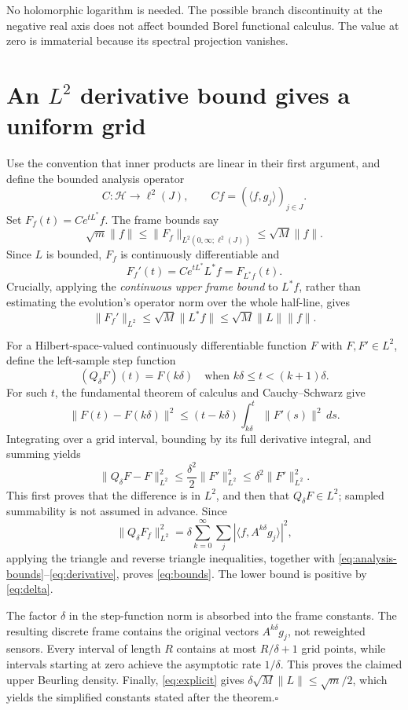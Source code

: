 \documentclass[11pt]{article}
\newcommand{\HH}{\mathcal H}
\begin{document}
No holomorphic logarithm is needed. The possible branch discontinuity at the negative real axis does not affect bounded Borel functional calculus. The value at zero is immaterial because its spectral projection vanishes.

\section{An \texorpdfstring{$L^2$}{L2} derivative bound gives a uniform grid}
Use the convention that inner products are linear in their first argument, and define the bounded analysis operator
\[
C:\HH\longrightarrow\ell^2(J),\qquad Cf=(\langle f,g_j\rangle)_{j\in J}.
\]
Set $F_f(t)=Ce^{tL^*}f$. The frame bounds say
\begin{equation}\label{eq:analysis-bounds}
\sqrt m\|f\|\leq\|F_f\|_{L^2(0,\infty;\ell^2(J))}\leq\sqrt M\|f\|.
\end{equation}
Since $L$ is bounded, $F_f$ is continuously differentiable and
\[
F_f'(t)=Ce^{tL^*}L^*f=F_{L^*f}(t).
\]
Crucially, applying the \emph{continuous upper frame bound} to $L^*f$, rather than estimating the evolution's operator norm over the whole half-line, gives
\begin{equation}\label{eq:derivative}
\|F_f'\|_{L^2}\leq\sqrt M\|L^*f\|\leq\sqrt M\|L\|\|f\|.
\end{equation}

For a Hilbert-space-valued continuously differentiable function $F$ with $F,F'\in L^2$, define the left-sample step function
\[
(Q_\delta F)(t)=F(k\delta)\quad\text{when }k\delta\leq t<(k+1)\delta.
\]
For such $t$, the fundamental theorem of calculus and Cauchy--Schwarz give
\[
\|F(t)-F(k\delta)\|^2
\leq(t-k\delta)\int_{k\delta}^t\|F'(s)\|^2\,ds.
\]
Integrating over a grid interval, bounding by its full derivative integral, and summing yields
\[
\|Q_\delta F-F\|_{L^2}^2
\leq\frac{\delta^2}{2}\|F'\|_{L^2}^2
\leq\delta^2\|F'\|_{L^2}^2.
\]
This first proves that the difference is in $L^2$, and then that $Q_\delta F\in L^2$; sampled summability is not assumed in advance. Since
\[
\|Q_\delta F_f\|_{L^2}^2
=\delta\sum_{k=0}^\infty\sum_j|\langle f,A^{k\delta}g_j\rangle|^2,
\]
applying the triangle and reverse triangle inequalities, together with \eqref{eq:analysis-bounds}--\eqref{eq:derivative}, proves \eqref{eq:bounds}. The lower bound is positive by \eqref{eq:delta}.

The factor $\delta$ in the step-function norm is absorbed into the frame constants. The resulting discrete frame contains the original vectors $A^{k\delta}g_j$, not reweighted sensors. Every interval of length $R$ contains at most $R/\delta+1$ grid points, while intervals starting at zero achieve the asymptotic rate $1/\delta$. This proves the claimed upper Beurling density. Finally, \eqref{eq:explicit} gives $\delta\sqrt M\|L\|\leq\sqrt m/2$, which yields the simplified constants stated after the theorem.\hfill$\square$
\end{document}
